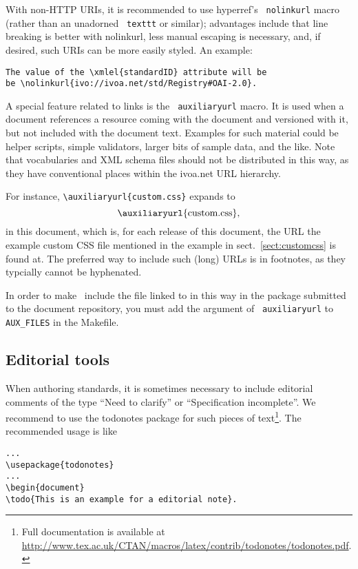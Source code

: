 \documentclass[11pt,a4paper]{ivoa}
\newcommand{\texword}[1]{\texttt{\color{texcolor} #1}}
\begin{document}
With non-HTTP URIs, it is recommended to use hyperref's
\texword{nolinkurl} macro (rather than an unadorned \texword{texttt} or
similar); advantages include that line breaking is better with
nolinkurl, less manual escaping is necessary, and, if desired, 
such URIs can be more easily styled.  An example:

\begin{lstlisting}
The value of the \xmlel{standardID} attribute will be
be \nolinkurl{ivo://ivoa.net/std/Registry#OAI-2.0}.
\end{lstlisting}

A special feature related to links is the \texword{auxiliaryurl} macro.
It is used when a document references a resource coming with the
document and versioned with it, but not included with the document text.
Examples for such material could be helper scripts, simple validators,
larger bits of sample data, and the like.  Note that vocabularies and
XML schema files should not be distributed in this way, as they have
conventional places within the ivoa.net URL hierarchy.

For instance, \verb|\auxiliaryurl{custom.css}| expands to
$$\hbox{\auxiliaryurl{custom.css},}$$ in this document, 
which is, for each release of this
document, the URL the example custom CSS file mentioned in the example
in sect.~\ref{sect:customcss} is found at.  The preferred way to include
such (long) URLs is in footnotes, as they typcially cannot be hyphenated.

In order to make \ivoatex~include the file linked to in this way in the
package submitted to the document repository, you must add the argument
of \texword{auxiliaryurl} to \verb|AUX_FILES| in the Makefile.

\subsection{Editorial tools}

When authoring standards, it is sometimes necessary to include
editorial comments of the type ``Need to clarify'' or ``Specification
incomplete''.  We recommend to use the todonotes package for such
pieces of text\footnote{Full documentation is available at
\url{http://www.tex.ac.uk/CTAN/macros/latex/contrib/todonotes/todonotes.pdf}.}.
The recommended usage is like
\begin{lstlisting}
...
\usepackage{todonotes}
...
\begin{document}
\todo{This is an example for a editorial note}.
\end{lstlisting}
\end{document}
